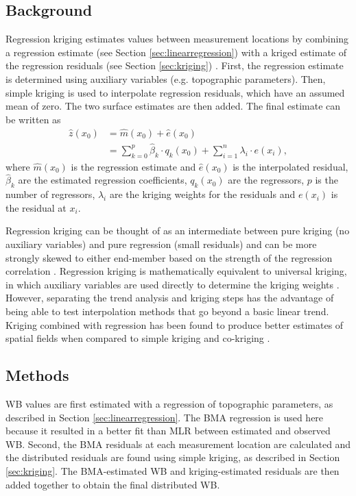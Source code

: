 \documentclass{sfuthesis}
\begin{document}
{\subsection{Background}

Regression kriging estimates values between measurement locations by combining a regression estimate (see Section \ref{sec:linearregression}) with a kriged estimate of the regression residuals (see Section \ref{sec:kriging}) \citep{Hengl2007}. First, the regression estimate is determined using auxiliary variables (e.g. topographic parameters). Then, simple kriging is used to interpolate regression residuals, which have an assumed mean of zero. The two surface estimates are then added. The final estimate can be written as 
\begin{align}
\hat{z}(x_0) &= \hat{m}(x_0) + \hat{e}(x_0)\\
& = \sum^p_{k=0}\hat{\beta}_k \cdot	q_k(x_0)+ \sum_{i=1}^{n} \lambda_i \cdot e(x_i),
\end{align}
where $\hat{m}(x_0)$ is the regression estimate and $\hat{e}(x_0)$ is the interpolated residual, $\hat{\beta}_k$ are the estimated regression coefficients, $q_k(x_0)$ are the regressors, $p$ is the number of regressors, $\lambda_i$ are the kriging weights for the residuals and $e(x_i)$ is the residual at $x_i$.

Regression kriging can be thought of as an intermediate between pure kriging (no auxiliary variables) and pure regression (small residuals) and can be more strongly skewed to either end-member based on the strength of the regression correlation \citep{Hengl2007}. Regression kriging is mathematically equivalent to universal kriging, in which auxiliary variables are used directly to determine the kriging weights \citep{Hengl2007}. However, separating the trend analysis and kriging steps has the advantage of being able to test interpolation methods that go beyond a basic linear trend. Kriging combined with regression has been found to produce better estimates of spatial fields when compared to simple kriging and co-kriging \citep{Knotters1995}.

\subsection{Methods}

WB values are first estimated with a regression of topographic parameters, as described in Section \ref{sec:linearregression}. The BMA regression is used here because it resulted in a better fit than MLR between estimated and observed WB. Second, the BMA residuals at each measurement location are calculated and the distributed residuals are found using simple kriging, as described in Section \ref{sec:kriging}. The BMA-estimated  WB and kriging-estimated residuals are then added together to obtain the final distributed WB. 

}
\end{document}
